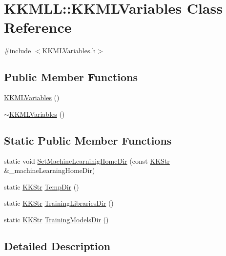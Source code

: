 \hypertarget{class_k_k_m_l_l_1_1_k_k_m_l_variables}{}\section{K\+K\+M\+LL\+:\+:K\+K\+M\+L\+Variables Class Reference}
\label{class_k_k_m_l_l_1_1_k_k_m_l_variables}


{\ttfamily \#include $<$K\+K\+M\+L\+Variables.\+h$>$}

\subsection*{Public Member Functions}
\begin{DoxyCompactItemize}
\item 
\hyperlink{class_k_k_m_l_l_1_1_k_k_m_l_variables_ade88c84350a340ea12241d006f95ee6b}{K\+K\+M\+L\+Variables} ()
\item 
\hyperlink{class_k_k_m_l_l_1_1_k_k_m_l_variables_a3fc49229ca16078510231900fcd6f79c}{$\sim$\+K\+K\+M\+L\+Variables} ()
\end{DoxyCompactItemize}
\subsection*{Static Public Member Functions}
\begin{DoxyCompactItemize}
\item 
static void \hyperlink{class_k_k_m_l_l_1_1_k_k_m_l_variables_aec470b01d29359be60d171234e4198aa}{Set\+Machine\+Learninig\+Home\+Dir} (const \hyperlink{class_k_k_b_1_1_k_k_str}{K\+K\+Str} \&\+\_\+machine\+Learning\+Home\+Dir)
\item 
static \hyperlink{class_k_k_b_1_1_k_k_str}{K\+K\+Str} \hyperlink{class_k_k_m_l_l_1_1_k_k_m_l_variables_a96d50c30b92b8fc2008d79dc765860bd}{Temp\+Dir} ()
\item 
static \hyperlink{class_k_k_b_1_1_k_k_str}{K\+K\+Str} \hyperlink{class_k_k_m_l_l_1_1_k_k_m_l_variables_a6534bcef90b6a5274998f339e4e48716}{Training\+Libraries\+Dir} ()
\item 
static \hyperlink{class_k_k_b_1_1_k_k_str}{K\+K\+Str} \hyperlink{class_k_k_m_l_l_1_1_k_k_m_l_variables_a5d979a176f5db194a4d9d96634e21ce0}{Training\+Models\+Dir} ()
\end{DoxyCompactItemize}


\subsection{Detailed Description}


